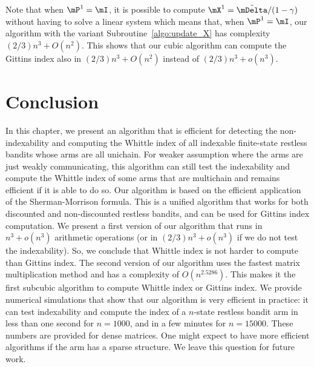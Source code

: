 Note that when $\mP^1=\mI$, it is possible to compute $\mX^1=\tilde{\mDelta}/(1-\gamma)$ without having to solve a linear system which means that, when $\mP^1=\mI$, our algorithm with the variant Subroutine~\ref{algo:update_X} has complexity $(2/3) n^3 +O(n^2)$.
This shows that our cubic algorithm can compute the Gittins index also in $(2/3) n^3 +O(n^2)$ instead of $(2/3)n^3 +o(n^3)$.

\section{Conclusion}
\label{sec:conclusion}

In this chapter, we present an algorithm that is efficient for detecting the non-indexability and computing the Whittle index of all indexable finite-state restless bandits whose arms are all unichain. For weaker assumption where the arms are just weakly communicating, this algorithm can still test the indexability and compute the Whittle index of some arms that are multichain and remains efficient if it is able to do so.
Our algorithm is based on the efficient application of the Sherman-Morrison formula. This is a unified algorithm that works for both discounted and non-discounted restless bandits, and can be used for Gittins index computation.  We present a first version of our algorithm that runs in $n^3+o(n^3)$ arithmetic operations (or in $(2/3)n^3+o(n^3)$ if we do not test the indexability). So, we conclude that Whittle index is not harder to compute than Gittins index. The second version of our algorithm uses the fastest matrix multiplication method and has a complexity of $O(n^{2.5286})$. This makes it the first subcubic algorithm to compute Whittle index or Gittins index. We provide numerical simulations that show that our algorithm is very efficient in practice: it can test indexability and compute the index of a $n$-state restless bandit arm in less than one second for $n=1000$, and in a few minutes for $n=15000$. These numbers are provided for dense matrices. One might expect to have more efficient algorithms if the arm has a sparse structure. We leave this question for future work. 


\endgroup
